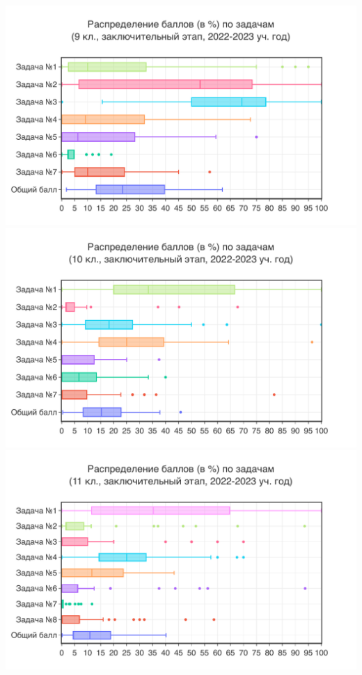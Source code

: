 \includegraphics[width=\linewidth]{../export/pdf/results/2023/respa/grade9-dist-box.pdf}
\includegraphics[width=\linewidth]{../export/pdf/results/2023/respa/grade10-dist-box.pdf}
\includegraphics[width=\linewidth]{../export/pdf/results/2023/respa/grade11-dist-box.pdf}

